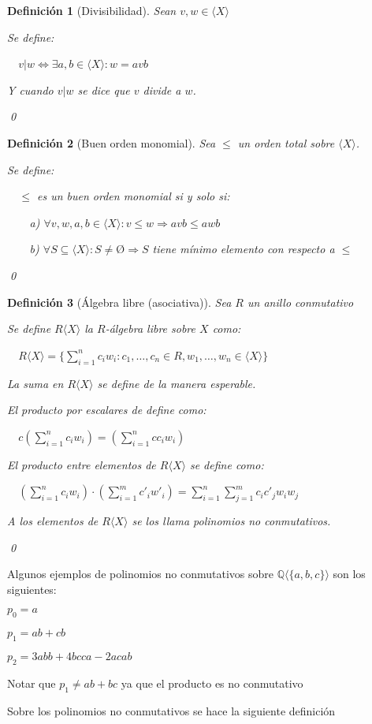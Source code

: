 \documentclass{amsbook}
\theoremstyle{customstyle}
\newtheorem{definition}{Definición}[section]
\newcommand{\definición}[2][]{
  \begin{definition}[#1]
  \setlength{\parindent}{2em} %
  #2
  \qed
  \end{definition}
}
\begin{document}
\definición[Divisibilidad] {
Sean $v, w ∈ ⟨X⟩$

Se define:

  $v | w ⇔ ∃a , b ∈ ⟨X⟩ : w = avb$

Y cuando $v | w$ se dice que $v$ divide a $w$.
}

\definición[Buen orden monomial] {
Sea $≤$ un orden total sobre $⟨X⟩$.

Se define:

  $≤$ es un buen orden monomial si y solo si:

    a) $∀v, w, a, b ∈ ⟨X⟩ : v ≤ w ⇒ avb ≤ awb$

    b) $∀S ⊆ ⟨X⟩ : S ≠ Ø ⇒ S$ tiene mínimo elemento con respecto a $≤$
}

\definición[Álgebra libre (asociativa)] {
Sea $R$ un anillo conmutativo

Se define $R⟨X⟩$ la $R$-álgebra libre sobre $X$ como:

  $R⟨X⟩ = \{\sum_{i = 1}^n c_i w_i : c_1, …, c_n ∈ R, w_1, …, w_n ∈ ⟨X⟩\}$

La suma en $R⟨X⟩$ se define de la manera esperable.

El producto por escalares de define como:

  $c (\sum_{i = 1}^n c_i w_i) = (\sum_{i = 1}^n c c_i w_i)$

El producto entre elementos de $R⟨X⟩$ se define como:

  $(\sum_{i = 1}^n c_i w_i) · (\sum_{i = 1}^m c'_i w'_i) = \sum_{i = 1}^n \sum_{j = 1}^m c_i c'_j w_i w_j$

A los elementos de $R⟨X⟩$ se los llama polinomios no conmutativos.
}

Algunos ejemplos de polinomios no conmutativos sobre $ℚ⟨\{a, b, c\}⟩$ son los siguientes:

$p_0 = a$

$p_1 = ab + cb$

$p_2 = 3 abb + 4 bcca - 2 acab$

Notar que $p_1 ≠ ab + bc$ ya que el producto es no conmutativo

Sobre los polinomios no conmutativos se hace la siguiente definición
\end{document}
